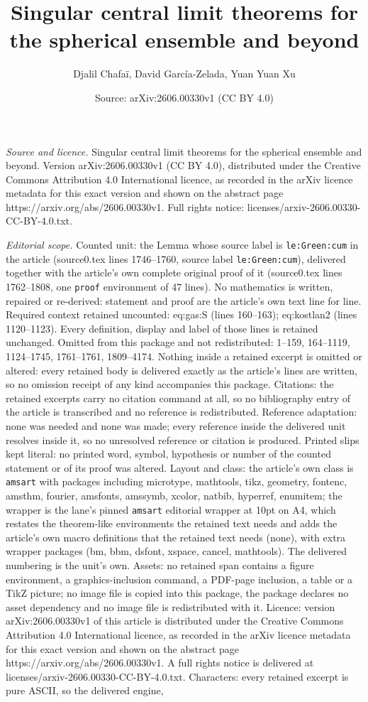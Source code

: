 \documentclass[10pt,a4paper]{amsart}
\title[Singular central limit theorems for the spherical ensemble a]{Singular central limit theorems for the spherical ensemble and beyond}
\author{Djalil Chafa\"i, David Garc\'ia-Zelada, Yuan Yuan Xu}
\date{Source: arXiv:2606.00330v1 (CC BY 4.0)}
\begin{document}
\maketitle

\noindent\emph{Source and licence.} Singular central limit theorems for the spherical ensemble and beyond. Version arXiv:2606.00330v1 (CC BY 4.0), distributed under the Creative Commons Attribution 4.0 International licence, as recorded in the arXiv licence metadata for this exact version and shown on the abstract page https://arxiv.org/abs/2606.00330v1. Full rights notice: licenses/arxiv-2606.00330-CC-BY-4.0.txt.\par\smallskip

\noindent\textit{Editorial scope.} Counted unit: the Lemma whose source label is \texttt{le:Green:cum} in the article (source0.tex lines 1746--1760, source label \texttt{le:Green:cum}), delivered together with the article's own complete original proof of it (source0.tex lines 1762--1808, one \texttt{proof} environment of 47 lines). No mathematics is written, repaired or re-derived: statement and proof are the article's own text line for line. Required context retained uncounted: eq:gas:S (lines 160--163); eq:kostlan2 (lines 1120--1123). Every definition, display and label of those lines is retained unchanged. Omitted from this package and not redistributed: 1--159, 164--1119, 1124--1745, 1761--1761, 1809--4174. Nothing inside a retained excerpt is omitted or altered: every retained body is delivered exactly as the article's lines are written, so no omission receipt of any kind accompanies this package. Citations: the retained excerpts carry no citation command at all, so no bibliography entry of the article is transcribed and no reference is redistributed. Reference adaptation: none was needed and none was made; every reference inside the delivered unit resolves inside it, so no unresolved reference or citation is produced. Printed slips kept literal: no printed word, symbol, hypothesis or number of the counted statement or of its proof was altered. Layout and class: the article's own class is \texttt{amsart} with packages including microtype, mathtools, tikz, geometry, fontenc, amsthm, fourier, amsfonts, amssymb, xcolor, natbib, hyperref, enumitem; the wrapper is the lane's pinned \texttt{amsart} editorial wrapper at 10pt on A4, which restates the theorem-like environments the retained text needs and adds the article's own macro definitions that the retained text needs (none), with extra wrapper packages (bm, bbm, dsfont, xspace, cancel, mathtools). The delivered numbering is the unit's own. Assets: no retained span contains a figure environment, a graphics-inclusion command, a PDF-page inclusion, a table or a TikZ picture; no image file is copied into this package, the package declares no asset dependency and no image file is redistributed with it. Licence: version arXiv:2606.00330v1 of this article is distributed under the Creative Commons Attribution 4.0 International licence, as recorded in the arXiv licence metadata for this exact version and shown on the abstract page https://arxiv.org/abs/2606.00330v1. A full rights notice is delivered at licenses/arxiv-2606.00330-CC-BY-4.0.txt. Characters: every retained excerpt is pure ASCII, so the delivered engine, 
\end{document}
